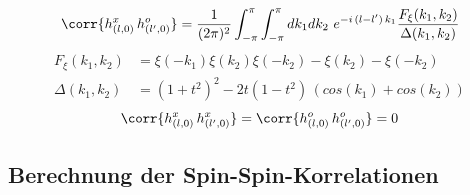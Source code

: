 \begin{grayframe}[frametitle = {Horizontal Graßmann-Korrelationen für das Unendliche Ising-Gitter}]
\begin{equation} 
\corr{h^{x}_{(l,0)}\, h^{o}_{(l', 0)} } = \frac{1}{(2\pi)^2}\int_{-\pi}^{\pi} \int_{-\pi}^{\pi} d k_1 d k_2 \,\,e^{-i\, (l-l') \,k_1} \frac{F_{\xi}(k_1,k_2)}{\Delta(k_1, k_2)} 
\end{equation}
\begin{align}
F_{\xi}(k_1,k_2) &= \xi(-k_1)\xi(k_2)\xi(-k_2) -\xi(k_2) - \xi(-k_2) \\
\Delta(k_1, k_2) &= (1+t^2)^2 - 2t(1-t^2)\,(cos(k_1) + cos(k_2))
\end{align}
\begin{equation} \label{eq: hxhx and hoho is null}
\corr{h^{x}_{(l,0)}\, h^{x}_{(l', 0)} } = 
\corr{h^{o}_{(l,0)}\, h^{o}_{(l', 0)} } = 0
\end{equation}
\end{grayframe}





\subsection{Berechnung der Spin-Spin-Korrelationen}

